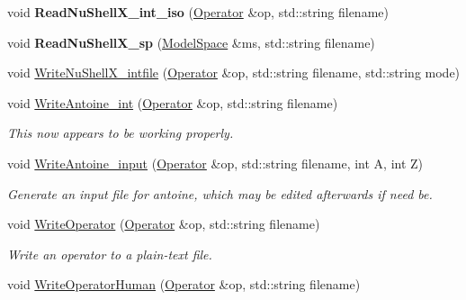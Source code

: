 \begin{DoxyCompactItemize}
\item 
\hypertarget{classReadWrite_a13e6e9aa6d1b968a4120020e73d2adb3}{void {\bfseries Read\-Nu\-Shell\-X\-\_\-int\-\_\-iso} (\hyperlink{classOperator}{Operator} \&op, std\-::string filename)}\label{classReadWrite_a13e6e9aa6d1b968a4120020e73d2adb3}

\item 
\hypertarget{classReadWrite_a47cc3b07121685ecfe768be71e89d409}{void {\bfseries Read\-Nu\-Shell\-X\-\_\-sp} (\hyperlink{classModelSpace}{Model\-Space} \&ms, std\-::string filename)}\label{classReadWrite_a47cc3b07121685ecfe768be71e89d409}

\item 
void \hyperlink{classReadWrite_a1ee0ccf08d328c35e30e228d3c2c343a}{Write\-Nu\-Shell\-X\-\_\-intfile} (\hyperlink{classOperator}{Operator} \&op, std\-::string filename, std\-::string mode)
\item 
\hypertarget{classReadWrite_ad37ece70e23fbc9704224bb9bfba3973}{void \hyperlink{classReadWrite_ad37ece70e23fbc9704224bb9bfba3973}{Write\-Antoine\-\_\-int} (\hyperlink{classOperator}{Operator} \&op, std\-::string filename)}\label{classReadWrite_ad37ece70e23fbc9704224bb9bfba3973}

\begin{DoxyCompactList}\small\item\em This now appears to be working properly. \end{DoxyCompactList}\item 
\hypertarget{classReadWrite_a5fe267246920f7a1e279527e50fdc598}{void \hyperlink{classReadWrite_a5fe267246920f7a1e279527e50fdc598}{Write\-Antoine\-\_\-input} (\hyperlink{classOperator}{Operator} \&op, std\-::string filename, int A, int Z)}\label{classReadWrite_a5fe267246920f7a1e279527e50fdc598}

\begin{DoxyCompactList}\small\item\em Generate an input file for antoine, which may be edited afterwards if need be. \end{DoxyCompactList}\item 
\hypertarget{classReadWrite_a9549c9659e5ad551cc90f64ad2c17485}{void \hyperlink{classReadWrite_a9549c9659e5ad551cc90f64ad2c17485}{Write\-Operator} (\hyperlink{classOperator}{Operator} \&op, std\-::string filename)}\label{classReadWrite_a9549c9659e5ad551cc90f64ad2c17485}

\begin{DoxyCompactList}\small\item\em Write an operator to a plain-\/text file. \end{DoxyCompactList}\item 
\hypertarget{classReadWrite_a7a1b1659d6b5efb2520ae88cf6f8d31a}{void \hyperlink{classReadWrite_a7a1b1659d6b5efb2520ae88cf6f8d31a}{Write\-Operator\-Human} (\hyperlink{classOperator}{Operator} \&op, std\-::string filename)}\label{classReadWrite_a7a1b1659d6b5efb2520ae88cf6f8d31a}


\end{DoxyCompactItemize}
